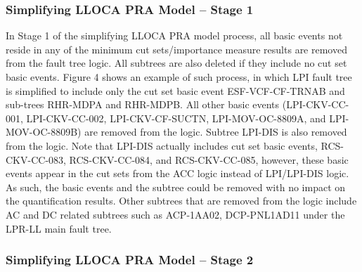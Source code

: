 \subsubsection{Simplifying LLOCA PRA Model – Stage 1}

In Stage 1 of the simplifying LLOCA PRA model process, all basic events not reside in any of the minimum cut sets/importance measure results are removed from the fault tree logic. All subtrees are also deleted if they include no cut set basic events. Figure 4 shows an example of such process, in which LPI fault tree is simplified to include only the cut set basic event ESF-VCF-CF-TRNAB and sub-trees RHR-MDPA and RHR-MDPB. All other basic events (LPI-CKV-CC-001, LPI-CKV-CC-002, LPI-CKV-CF-SUCTN, LPI-MOV-OC-8809A, and LPI-MOV-OC-8809B) are removed from the logic. Subtree LPI-DIS is also removed from the logic. Note that LPI-DIS actually includes cut set basic events, RCS-CKV-CC-083, RCS-CKV-CC-084, and RCS-CKV-CC-085, however, these basic events appear in the cut sets from the ACC logic instead of LPI/LPI-DIS logic. As such, the basic events and the subtree could be removed with no impact on the quantification results. Other subtrees that are removed from the logic include AC and DC related subtrees such as ACP-1AA02, DCP-PNL1AD11 under the LPR-LL main fault tree.

\subsubsection{Simplifying LLOCA PRA Model – Stage 2}

